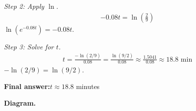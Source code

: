 \documentclass[11pt]{article}
\begin{document}
\textit{Step 2: Apply \( \ln \).}
\[\begin{gathered}
-0.08t = \ln\!\left(\frac{2}{9}\right)
\end{gathered}\]
\( \ln(e^{-0.08t}) = -0.08t \).

\textit{Step 3: Solve for \( t \).}
\[\begin{gathered}
t = \frac{-\ln(2/9)}{0.08} = \frac{\ln(9/2)}{0.08} \approx \frac{1.5041}{0.08} \approx 18.8 \text{ min}
\end{gathered}\]
\( -\ln(2/9) = \ln(9/2) \).

\begin{answerbox}
\textbf{Final answer:}\quad \(\displaystyle  t \approx 18.8 \) minutes
\end{answerbox}
\textbf{Diagram.}

\begin{center}
\end{center}
\end{document}
